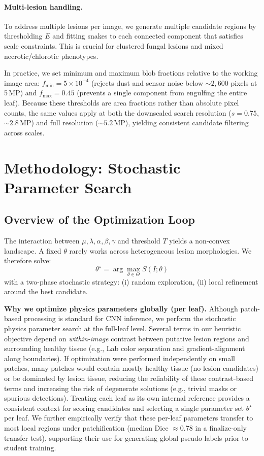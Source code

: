 \documentclass[journal]{IEEEtran}
\begin{document}
\paragraph{Multi-lesion handling.}
To address multiple lesions per image, we generate multiple candidate regions by thresholding $E$ and fitting snakes to each connected component that satisfies scale constraints. This is crucial for clustered fungal lesions and mixed necrotic/chlorotic phenotypes.

In practice, we set minimum and maximum blob fractions relative to the working image area: $f_{\min}=5\times10^{-4}$ (rejects dust and sensor noise below ${\sim}2{,}600$ pixels at 5\,MP) and $f_{\max}=0.45$ (prevents a single component from engulfing the entire leaf). Because these thresholds are area fractions rather than absolute pixel counts, the same values apply at both the downscaled search resolution ($s{=}0.75$, ${\sim}2.8$\,MP) and full resolution (${\sim}5.2$\,MP), yielding consistent candidate filtering across scales.

\section{Methodology: Stochastic Parameter Search}

\subsection{Overview of the Optimization Loop}
The interaction between $\mu,\lambda,\alpha,\beta,\gamma$ and threshold $T$ yields a non-convex landscape. A fixed $\theta$ rarely works across heterogeneous lesion morphologies. We therefore solve:
\begin{equation}
\theta^\star = \arg\max_{\theta\in\Theta} S(I;\theta)
\end{equation}
with a two-phase stochastic strategy: (i) random exploration, (ii) local refinement around the best candidate.

\textbf{Why we optimize physics parameters globally (per leaf).}
Although patch-based processing is standard for CNN inference, we perform the stochastic physics parameter search at the full-leaf level. Several terms in our heuristic objective depend on \emph{within-image} contrast between putative lesion regions and surrounding healthy tissue (e.g., Lab color separation and gradient-alignment along boundaries). If optimization were performed independently on small patches, many patches would contain mostly healthy tissue (no lesion candidates) or be dominated by lesion tissue, reducing the reliability of these contrast-based terms and increasing the risk of degenerate solutions (e.g., trivial masks or spurious detections). Treating each leaf as its own internal reference provides a consistent context for scoring candidates and selecting a single parameter set $\theta^\star$ per leaf. We further empirically verify that these per-leaf parameters transfer to most local regions under patchification (median Dice $\approx 0.78$ in a finalize-only transfer test), supporting their use for generating global pseudo-labels prior to student training.
\end{document}
